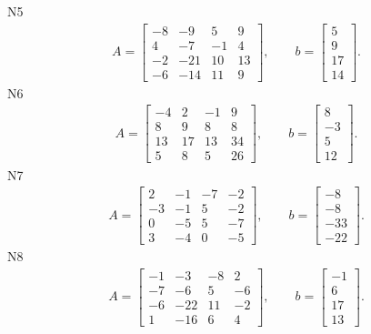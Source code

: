 \documentclass[11pt]{report}
\begin{document}
N5
\begin{align*}
 A = \left[\begin{matrix}-8 & -9 & 5 & 9\\4 & -7 & -1 & 4\\-2 & -21 & 10 & 13\\-6 & -14 & 11 & 9\end{matrix}\right],
\qquad b = \left[\begin{matrix}5\\9\\17\\14\end{matrix}\right]. 
 \end{align*}
N6
\begin{align*}
 A = \left[\begin{matrix}-4 & 2 & -1 & 9\\8 & 9 & 8 & 8\\13 & 17 & 13 & 34\\5 & 8 & 5 & 26\end{matrix}\right],
\qquad b = \left[\begin{matrix}8\\-3\\5\\12\end{matrix}\right]. 
 \end{align*}
N7
\begin{align*}
 A = \left[\begin{matrix}2 & -1 & -7 & -2\\-3 & -1 & 5 & -2\\0 & -5 & 5 & -7\\3 & -4 & 0 & -5\end{matrix}\right],
\qquad b = \left[\begin{matrix}-8\\-8\\-33\\-22\end{matrix}\right]. 
 \end{align*}
N8
\begin{align*}
 A = \left[\begin{matrix}-1 & -3 & -8 & 2\\-7 & -6 & 5 & -6\\-6 & -22 & 11 & -2\\1 & -16 & 6 & 4\end{matrix}\right],
\qquad b = \left[\begin{matrix}-1\\6\\17\\13\end{matrix}\right]. 
 \end{align*}
\end{document}
